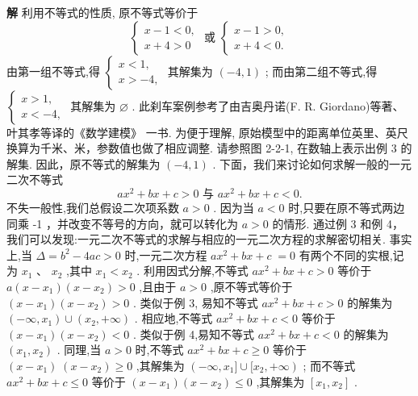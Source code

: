 \documentclass[a4paper,10pt,oneside,fontset=none]{ctexbook}
\renewcommand{\geq}{\geqslant}
\renewcommand{\leq}{\leqslant}
\numberwithin{equation}{chapter}
\newenvironment{solution}{\begin{solutionBox}}{\end{solutionBox}}
\begin{document}
\begin{solution}
\textbf{解}
利用不等式的性质, 原不等式等价于
$$
\left\{  {\begin{array}{l} x - 1 < 0, \\  x + 4 > 0 \end{array}\text{ 或 }\left\{  \begin{array}{l} x - 1 > 0, \\  x + 4 < 0. \end{array}\right. }\right.
$$
由第一组不等式,得 $\left\{  \begin{array}{l} x < 1, \\  x >  - 4, \end{array}\right.$ 其解集为 $\left( {-4,1}\right)$ ; 而由第二组不等式,得 $\left\{  \begin{array}{l} x > 1, \\  x <  - 4, \end{array}\right.$ 其解集为 $\varnothing$ .
此刹车案例参考了由吉奥丹诺(F. R. Giordano)等著、叶其孝等译的《数学建模》 一书. 为便于理解, 原始模型中的距离单位英里、英尺换算为千米、米，参数值也做了相应调整.
请参照图 2-2-1, 在数轴上表示出例 3 的解集.
因此，原不等式的解集为 $\left( {-4,1}\right)$ .
下面，我们来讨论如何求解一般的一元二次不等式
$$
a{x}^{2} + {bx} + c > 0\text{ 与 }a{x}^{2} + {bx} + c < 0.
$$
不失一般性,我们总假设二次项系数 $a > 0$ . 因为当 $a < 0$ 时,只要在原不等式两边同乘 -1 ，并改变不等号的方向，就可以转化为 $a > 0$ 的情形.
通过例 3 和例 4，我们可以发现:一元二次不等式的求解与相应的一元二次方程的求解密切相关.
事实上,当 $\Delta  = {b}^{2} - {4ac} > 0$ 时,一元二次方程 $a{x}^{2} + {bx} + c \; = 0$ 有两个不同的实根,记为 ${x}_{1}\text{ 、 }{x}_{2}$ ,其中 ${x}_{1} < {x}_{2}$ . 利用因式分解,不等式 $a{x}^{2} + {bx} + c > 0$ 等价于 $a\left( {x - {x}_{1}}\right) \left( {x - {x}_{2}}\right)  > 0$ ,且由于 $a > 0$ ,原不等式等价于 $\left( {x - {x}_{1}}\right) \left( {x - {x}_{2}}\right)  > 0$ . 类似于例 3, 易知不等式 $a{x}^{2} + {bx} + c > 0$ 的解集为 $\left( {-\infty ,{x}_{1}}\right)  \cup  \left( {{x}_{2}, + \infty }\right)$ . 相应地,不等式 $a{x}^{2} + {bx} + c < 0$ 等价于 $\left( {x - {x}_{1}}\right) \left( {x - {x}_{2}}\right)  < 0$ . 类似于例 4,易知不等式 $a{x}^{2} + {bx} + c < 0$ 的解集为 $\left( {{x}_{1},{x}_{2}}\right)$ .
同理,当 $a > 0$ 时,不等式 $a{x}^{2} + {bx} + c \geq  0$ 等价于 $\left( {x - {x}_{1}}\right) \; \left( {x - {x}_{2}}\right)  \geq  0$ ,其解集为 $\left( {-\infty ,{x}_{1}\rbrack \cup \lbrack {x}_{2}, + \infty }\right)$ ; 而不等式 $a{x}^{2} + {bx} + c \leq  0$ 等价于 $\left( {x - {x}_{1}}\right) \left( {x - {x}_{2}}\right)  \leq  0$ ,其解集为 $\left\lbrack  {{x}_{1},{x}_{2}}\right\rbrack$ .

\end{solution}
\end{document}
